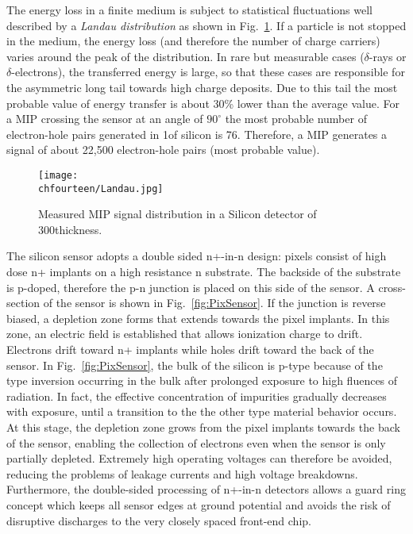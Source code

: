 The energy loss in a finite medium is subject to statistical fluctuations well described by a {\it Landau distribution} as shown in Fig.~\ref{fig:Landau}.
If a particle is not stopped in the medium, the energy loss (and therefore the number of charge carriers) varies around the peak of the distribution.
In rare but measurable cases ($\delta$-rays or $\delta$-electrons), the transferred energy is large, so that these cases are responsible for the asymmetric long tail towards high charge deposits.
Due to this tail the most probable value of energy transfer is about 30\% lower than the average value.
For a MIP crossing the sensor at an angle of $90^\circ$ the most probable number of electron-hole pairs generated in 1\mum of silicon is 76.
Therefore, a MIP generates a signal of about 22,500 electron-hole pairs (most probable value).

\begin{figure}[!htb]
 \begin{center}
 \texttt{[image: \\chfourteen/Landau.jpg]}
 \end{center}
 \caption{Measured MIP signal distribution in a Silicon detector of 300\mum thickness.}
 \label{fig:Landau}
\end{figure}

The silicon sensor adopts a double sided n+-in-n design: pixels consist of high dose n+ implants on a high resistance n substrate.
The backside of the substrate is p-doped, therefore the p-n junction is placed on this side of the sensor. A cross-section of the sensor is shown in Fig.~\ref{fig:PixSensor}.
If the junction is reverse biased, a depletion zone forms that extends towards the pixel implants. In this zone, an electric field is established that allows ionization charge to drift. Electrons drift toward n+ implants while holes drift toward the back of the sensor. In Fig.~\ref{fig:PixSensor}, the bulk of the silicon is p-type because of the type inversion occurring in the bulk after prolonged exposure to high fluences of radiation.
In fact, the effective concentration of impurities gradually decreases with exposure, until a transition to the the other type material behavior occurs.
At this stage, the depletion zone grows from the pixel implants towards the back of the sensor, enabling the collection of electrons even when the sensor is only partially depleted.
Extremely high operating voltages can therefore be avoided, reducing the problems of leakage currents and high voltage breakdowns. Furthermore, the double-sided processing of n+-in-n detectors allows a guard ring concept which keeps all sensor edges at ground potential and avoids the risk of disruptive discharges to the very closely spaced front-end chip.

